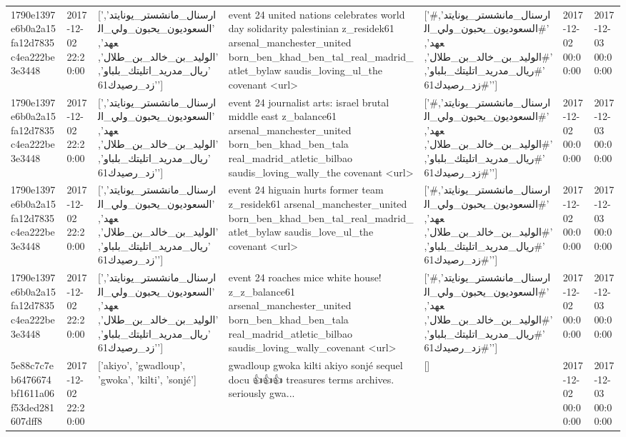 \begin{tabular}{lllllll}
1790e1397e6b0a2a15fa12d7835c4ea222be3e3448 & 2017-12-02 22:20:00 & ['ارسنال_مانشستر_يونايتد', 'السعوديون_يحبون_ولي_العهد', 'الوليد_بن_خالد_بن_طلال', 'ريال_مدريد_اتليتك_بلباو', 'زد_رصيدك61'] & event 24 united nations celebrates world day solidarity palestinian z\_residek61 arsenal\_manchester\_united born\_ben\_khad\_ben\_tal\_real\_madrid\_atlet\_bylaw saudis\_loving\_ul\_the covenant <url> & ['#ارسنال_مانشستر_يونايتد', '#السعوديون_يحبون_ولي_العهد', '#الوليد_بن_خالد_بن_طلال', '#ريال_مدريد_اتليتك_بلباو', '#زد_رصيدك61'] & 2017-12-02 00:00:00 & 2017-12-03 00:00:00 \\
1790e1397e6b0a2a15fa12d7835c4ea222be3e3448 & 2017-12-02 22:20:00 & ['ارسنال_مانشستر_يونايتد', 'السعوديون_يحبون_ولي_العهد', 'الوليد_بن_خالد_بن_طلال', 'ريال_مدريد_اتليتك_بلباو', 'زد_رصيدك61'] & event 24 journalist arts: israel brutal middle east z\_balance61 arsenal\_manchester\_united born\_ben\_khad\_ben\_tala real\_madrid\_atletic\_bilbao saudis\_loving\_wally\_the covenant <url> & ['#ارسنال_مانشستر_يونايتد', '#السعوديون_يحبون_ولي_العهد', '#الوليد_بن_خالد_بن_طلال', '#ريال_مدريد_اتليتك_بلباو', '#زد_رصيدك61'] & 2017-12-02 00:00:00 & 2017-12-03 00:00:00 \\
1790e1397e6b0a2a15fa12d7835c4ea222be3e3448 & 2017-12-02 22:20:00 & ['ارسنال_مانشستر_يونايتد', 'السعوديون_يحبون_ولي_العهد', 'الوليد_بن_خالد_بن_طلال', 'ريال_مدريد_اتليتك_بلباو', 'زد_رصيدك61'] & event 24 higuain hurts former team z\_residek61 arsenal\_manchester\_united born\_ben\_khad\_ben\_tal\_real\_madrid\_atlet\_bylaw saudis\_love\_ul\_the covenant <url> & ['#ارسنال_مانشستر_يونايتد', '#السعوديون_يحبون_ولي_العهد', '#الوليد_بن_خالد_بن_طلال', '#ريال_مدريد_اتليتك_بلباو', '#زد_رصيدك61'] & 2017-12-02 00:00:00 & 2017-12-03 00:00:00 \\
1790e1397e6b0a2a15fa12d7835c4ea222be3e3448 & 2017-12-02 22:20:00 & ['ارسنال_مانشستر_يونايتد', 'السعوديون_يحبون_ولي_العهد', 'الوليد_بن_خالد_بن_طلال', 'ريال_مدريد_اتليتك_بلباو', 'زد_رصيدك61'] & event 24 roaches mice white house! z\_z\_balance61 arsenal\_manchester\_united born\_ben\_khad\_ben\_tala real\_madrid\_atletic\_bilbao saudis\_loving\_wally\_covenant <url> & ['#ارسنال_مانشستر_يونايتد', '#السعوديون_يحبون_ولي_العهد', '#الوليد_بن_خالد_بن_طلال', '#ريال_مدريد_اتليتك_بلباو', '#زد_رصيدك61'] & 2017-12-02 00:00:00 & 2017-12-03 00:00:00 \\
5e88c7c7eb6476674bf1611a06f53ded281607dff8 & 2017-12-02 22:20:00 & ['akiyo', 'gwadloup', 'gwoka', 'kilti', 'sonjé'] & gwadloup gwoka kilti akiyo sonjé sequel docu 👍👍👍 treasures terms archives. seriously gwa... & [] & 2017-12-02 00:00:00 & 2017-12-03 00:00:00 \\

\end{tabular}
